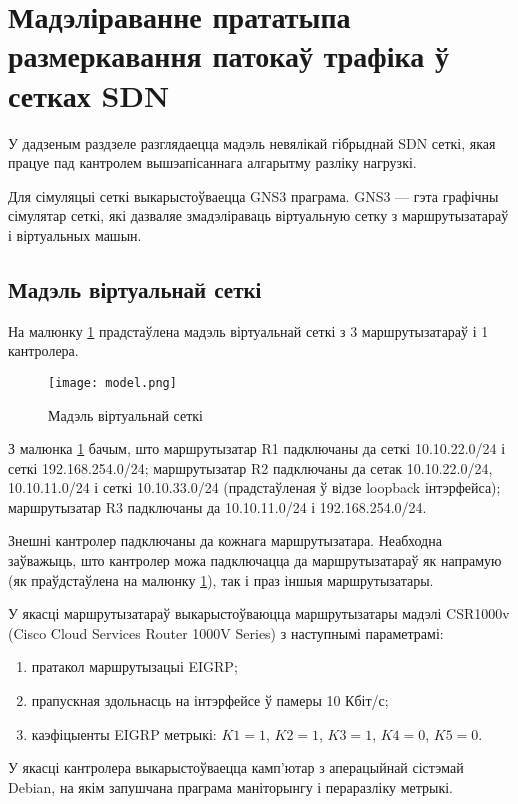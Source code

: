 \section{Мадэліраванне прататыпа размеркавання патокаў трафіка ў сетках SDN}

У дадзеным раздзеле разглядаецца мадэль невялікай гібрыднай SDN сеткі, якая працуе
пад кантролем вышэапісаннага алгарытму разліку нагрузкі.

Для сімуляцыі сеткі выкарыстоўваецца GNS3 праграма.
GNS3 --- гэта графічны сімулятар сеткі, які дазваляе змадэліраваць віртуальную
сетку з маршрутызатараў і віртуальных машын.

\subsection{Мадэль віртуальнай сеткі}

На малюнку \ref{img: model} прадстаўлена мадэль віртуальнай сеткі з 3 маршрутызатараў і 1 кантролера.

\begin{figure}[h!]
    \centering
    \texttt{[image: model.png]}
    \caption{Мадэль віртуальнай сеткі}
    \label{img: model} 
\end{figure}

З малюнка \ref{img: model} бачым, што маршрутызатар R1 падключаны да сеткі 10.10.22.0/24 і сеткі 192.168.254.0/24;
маршрутызатар R2 падключаны да сетак 10.10.22.0/24, 10.10.11.0/24 і сеткі 10.10.33.0/24 (прадстаўленая ў відзе loopback інтэрфейса);
маршрутызатар R3 падключаны да 10.10.11.0/24 і 192.168.254.0/24.

Знешні кантролер падключаны да кожнага маршрутызатара. Неабходна заўважыць, што кантролер можа падключацца да маршрутызатараў
як напрамую (як праўдстаўлена на малюнку \ref{img: model}), так і праз іншыя маршрутызатары.

У якасці маршрутызатараў выкарыстоўваюцца маршрутызатары мадэлі CSR1000v (Cisco Cloud Services Router 1000V Series)
з наступнымі параметрамі:
\begin{enumerate}
    \item пратакол маршрутызацыі EIGRP;
    \item прапускная здольнасць на інтэрфейсе ў памеры 10 Кбіт/с;
    \item каэфіцыенты EIGRP метрыкі: $K1 = 1$, $K2 = 1$, $K3 = 1$, $K4 = 0$, $K5 = 0$.
\end{enumerate}

У якасці кантролера выкарыстоўваецца камп'ютар з аперацыйнай сістэмай Debian, на якім
запушчана праграма маніторынгу і пераразліку метрыкі.

